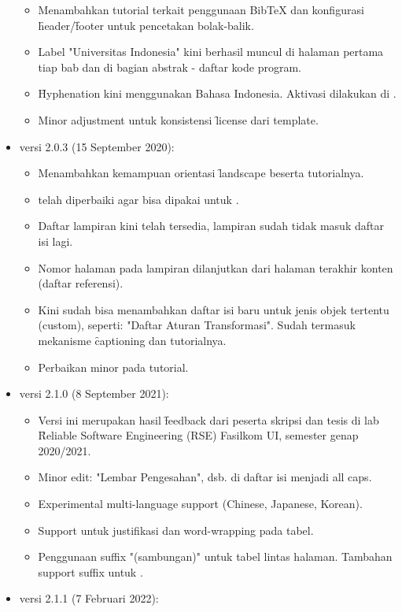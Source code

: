 \begin{itemize}
\begin{itemize}
			\item Menambahkan tutorial terkait penggunaan BibTeX dan konfigurasi \f{header}/\f{footer} untuk pencetakan bolak-balik.
			\item Label "Universitas Indonesia" kini berhasil muncul di halaman pertama tiap bab dan di bagian abstrak - daftar kode program.
			\item \f{Hyphenation} kini menggunakan  Bahasa Indonesia. Aktivasi dilakukan di .
			\item Minor adjustment untuk konsistensi \f{license} dari template.
		\end{itemize}
	\item versi 2.0.3 (15 September 2020):
		\begin{itemize}
			\item Menambahkan kemampuan orientasi \f{landscape} beserta tutorialnya.
			\item {} telah diperbaiki agar bisa dipakai untuk .
			\item Daftar lampiran kini telah tersedia, lampiran sudah tidak masuk daftar isi lagi.
			\item Nomor halaman pada lampiran dilanjutkan dari halaman terakhir konten (daftar referensi).
			\item Kini sudah bisa menambahkan daftar isi baru untuk jenis objek tertentu (custom), seperti: "Daftar Aturan Transformasi". Sudah termasuk mekanisme \f{captioning} dan tutorialnya.
			\item Perbaikan minor pada tutorial.
		\end{itemize}
	\item versi 2.1.0 (8 September 2021):
		\begin{itemize}
			\item Versi ini merupakan hasil \f{feedback} dari peserta skripsi dan tesis di lab \f{Reliable Software Engineering} (RSE) Fasilkom UI, semester genap 2020/2021.
			\item Minor edit: "Lembar Pengesahan", dsb. di daftar isi menjadi all caps.
			\item Experimental multi-language support (Chinese, Japanese, Korean).
			\item Support untuk justifikasi dan word-wrapping pada tabel.
			\item Penggunaan suffix "(sambungan)" untuk tabel lintas halaman. Tambahan support suffix untuk .
		\end{itemize}
	\item versi 2.1.1 (7 Februari 2022):

\end{itemize}
